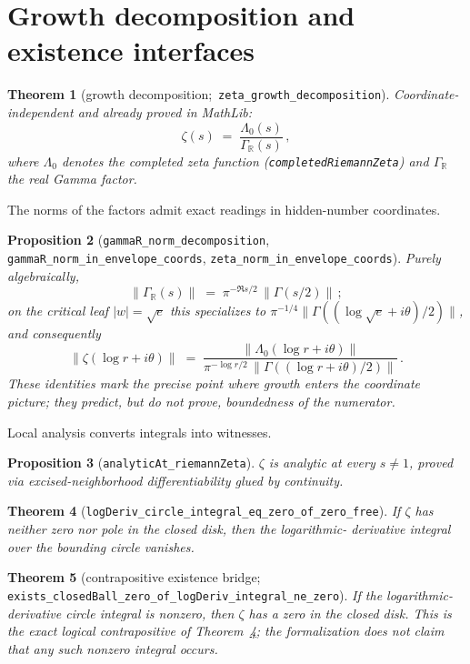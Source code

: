 \documentclass[submission]{jsfds}
\newtheorem{theorem}{Theorem}
\newtheorem{proposition}[theorem]{Proposition}
\newcommand{\Lean}[1]{\texttt{#1}}
\newcommand{\abs}[1]{\lvert #1\rvert}
\newcommand{\Norm}[1]{\lVert #1\rVert}
\begin{document}
\section{Growth decomposition and existence interfaces}\label{sec:growth}

\begin{theorem}[growth decomposition;\,
\Lean{zeta_growth_decomposition}]\label{thm:decomp}
Coordinate-independent and already proved in MathLib:
\[
  \zeta(s) \;=\; \frac{\Lambda_{0}(s)}{\Gamma_{\mathbb{R}}(s)}\, ,
\]
where $\Lambda_{0}$ denotes the completed zeta function
(\Lean{completedRiemannZeta}) and $\Gamma_{\mathbb{R}}$ the real Gamma factor.
\end{theorem}

The norms of the factors admit exact readings in hidden-number coordinates.

\begin{proposition}[\Lean{gammaR_norm_decomposition},
\Lean{gammaR_norm_in_envelope_coords},
\Lean{zeta_norm_in_envelope_coords}]\label{prop:normread}
Purely algebraically,
\[
  \Norm{\Gamma_{\mathbb{R}}(s)}
  \;=\; \pi^{-\Re s/2}\,\Norm{\Gamma(s/2)}\, ;
\]
on the critical leaf $\abs{w}=\sqrt{e}$ this specializes to
$\pi^{-1/4}\Norm{\Gamma((\log\sqrt{e}+i\theta)/2)}$, and consequently
\[
  \Norm{\zeta(\log r+i\theta)}
  \;=\;
  \frac{\Norm{\Lambda_{0}(\log r+i\theta)}}
       {\pi^{-\log r/2}\,\Norm{\Gamma((\log r+i\theta)/2)}}\, .
\]
These identities mark the precise point where growth enters the coordinate
picture; they predict, but do not prove, boundedness of the numerator.
\end{proposition}

Local analysis converts integrals into witnesses.

\begin{proposition}[\Lean{analyticAt_riemannZeta}]\label{prop:analytic}
$\zeta$ is analytic at every $s\neq 1$, proved via excised-neighborhood
differentiability glued by continuity.
\end{proposition}

\begin{theorem}[\Lean{logDeriv_circle_integral_eq_zero_of_zero_free}]
\label{thm:zerofreeint}
If $\zeta$ has neither zero nor pole in the closed disk, then the logarithmic-
derivative integral over the bounding circle vanishes.
\end{theorem}

\begin{theorem}[contrapositive existence bridge;\,
\Lean{exists_closedBall_zero_of_logDeriv_integral_ne_zero}]
\label{thm:existbridge}
If the logarithmic-derivative circle integral is nonzero, then $\zeta$ has a
zero in the closed disk. This is the exact logical contrapositive of
Theorem~\ref{thm:zerofreeint}; the formalization does \emph{not} claim that any
such nonzero integral occurs.
\end{theorem}
\end{document}
